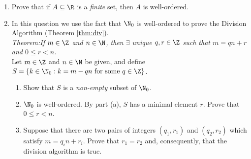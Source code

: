 \begin{enumerate}
	\item Prove that if $A\subseteq\R$ is a \emph{finite} set, then $A$ is well-ordered.
  
	\item In this question we use the fact that $\N_0$ is well-ordered to prove the Division Algorithm (Theorem \ref{thm:div}).\\[10pt]
	\emph{Theorem:\quad If $m\in\Z$ and $n\in\N$, then $\exists$ unique $q,r\in\Z$ such that $m=qn+r$ and $0\le r<n$.}\\[-7pt]
	
	Let $m\in\Z$ and $n\in\N$ be given, and define $S=\{k\in\N_0:k=m-qn\text{ for some }q\in\Z\}$.	
	\begin{enumerate}
		\item Show that $S$ is a \emph{non-empty} subset of $\N_0$.
		\item $\N_0$ is well-ordered. By part (a), $S$ has a minimal element $r$. Prove that $0\le r<n$.
		\item Suppose that there are two pairs of integers $(q_1,r_1)$ and $(q_2,r_2)$ which satisfy $m=q_in+r_i$. Prove that $r_1=r_2$ and, consequently, that the division algorithm is true.
	\end{enumerate}
	

\end{enumerate}
